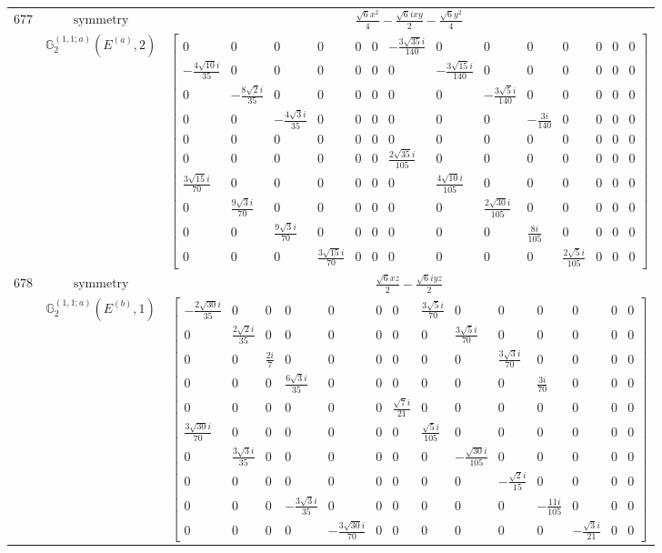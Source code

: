 \documentclass[fleqn,8pt,landscape]{jsarticle}
\begin{document}
\begin{longtable}{ccc}
$ 677 $ & $ \text{symmetry} $ & $ \frac{\sqrt{6} x^{2}}{4} - \frac{\sqrt{6} i x y}{2} - \frac{\sqrt{6} y^{2}}{4} $ \\
$  $ & $ \mathbb{G}_{2}^{(1,1;a)}(E^{(a)},2) $ & $ \begin{bmatrix} 0 & 0 & 0 & 0 & 0 & 0 & - \frac{3 \sqrt{35} i}{140} & 0 & 0 & 0 & 0 & 0 & 0 & 0 \\ - \frac{4 \sqrt{10} i}{35} & 0 & 0 & 0 & 0 & 0 & 0 & - \frac{3 \sqrt{15} i}{140} & 0 & 0 & 0 & 0 & 0 & 0 \\ 0 & - \frac{8 \sqrt{2} i}{35} & 0 & 0 & 0 & 0 & 0 & 0 & - \frac{3 \sqrt{5} i}{140} & 0 & 0 & 0 & 0 & 0 \\ 0 & 0 & - \frac{4 \sqrt{3} i}{35} & 0 & 0 & 0 & 0 & 0 & 0 & - \frac{3 i}{140} & 0 & 0 & 0 & 0 \\ 0 & 0 & 0 & 0 & 0 & 0 & 0 & 0 & 0 & 0 & 0 & 0 & 0 & 0 \\ 0 & 0 & 0 & 0 & 0 & 0 & \frac{2 \sqrt{35} i}{105} & 0 & 0 & 0 & 0 & 0 & 0 & 0 \\ \frac{3 \sqrt{15} i}{70} & 0 & 0 & 0 & 0 & 0 & 0 & \frac{4 \sqrt{10} i}{105} & 0 & 0 & 0 & 0 & 0 & 0 \\ 0 & \frac{9 \sqrt{3} i}{70} & 0 & 0 & 0 & 0 & 0 & 0 & \frac{2 \sqrt{30} i}{105} & 0 & 0 & 0 & 0 & 0 \\ 0 & 0 & \frac{9 \sqrt{3} i}{70} & 0 & 0 & 0 & 0 & 0 & 0 & \frac{8 i}{105} & 0 & 0 & 0 & 0 \\ 0 & 0 & 0 & \frac{3 \sqrt{15} i}{70} & 0 & 0 & 0 & 0 & 0 & 0 & \frac{2 \sqrt{5} i}{105} & 0 & 0 & 0 \end{bmatrix} $ \\ \hline
$ 678 $ & $ \text{symmetry} $ & $ \frac{\sqrt{6} x z}{2} - \frac{\sqrt{6} i y z}{2} $ \\
$  $ & $ \mathbb{G}_{2}^{(1,1;a)}(E^{(b)},1) $ & $ \begin{bmatrix} - \frac{2 \sqrt{30} i}{35} & 0 & 0 & 0 & 0 & 0 & 0 & \frac{3 \sqrt{5} i}{70} & 0 & 0 & 0 & 0 & 0 & 0 \\ 0 & \frac{2 \sqrt{2} i}{35} & 0 & 0 & 0 & 0 & 0 & 0 & \frac{3 \sqrt{5} i}{70} & 0 & 0 & 0 & 0 & 0 \\ 0 & 0 & \frac{2 i}{7} & 0 & 0 & 0 & 0 & 0 & 0 & \frac{3 \sqrt{3} i}{70} & 0 & 0 & 0 & 0 \\ 0 & 0 & 0 & \frac{6 \sqrt{3} i}{35} & 0 & 0 & 0 & 0 & 0 & 0 & \frac{3 i}{70} & 0 & 0 & 0 \\ 0 & 0 & 0 & 0 & 0 & 0 & \frac{\sqrt{7} i}{21} & 0 & 0 & 0 & 0 & 0 & 0 & 0 \\ \frac{3 \sqrt{30} i}{70} & 0 & 0 & 0 & 0 & 0 & 0 & \frac{\sqrt{5} i}{105} & 0 & 0 & 0 & 0 & 0 & 0 \\ 0 & \frac{3 \sqrt{3} i}{35} & 0 & 0 & 0 & 0 & 0 & 0 & - \frac{\sqrt{30} i}{105} & 0 & 0 & 0 & 0 & 0 \\ 0 & 0 & 0 & 0 & 0 & 0 & 0 & 0 & 0 & - \frac{\sqrt{2} i}{15} & 0 & 0 & 0 & 0 \\ 0 & 0 & 0 & - \frac{3 \sqrt{3} i}{35} & 0 & 0 & 0 & 0 & 0 & 0 & - \frac{11 i}{105} & 0 & 0 & 0 \\ 0 & 0 & 0 & 0 & - \frac{3 \sqrt{30} i}{70} & 0 & 0 & 0 & 0 & 0 & 0 & - \frac{\sqrt{3} i}{21} & 0 & 0 \end{bmatrix} $ \\ \hline

\end{longtable}
\end{document}
